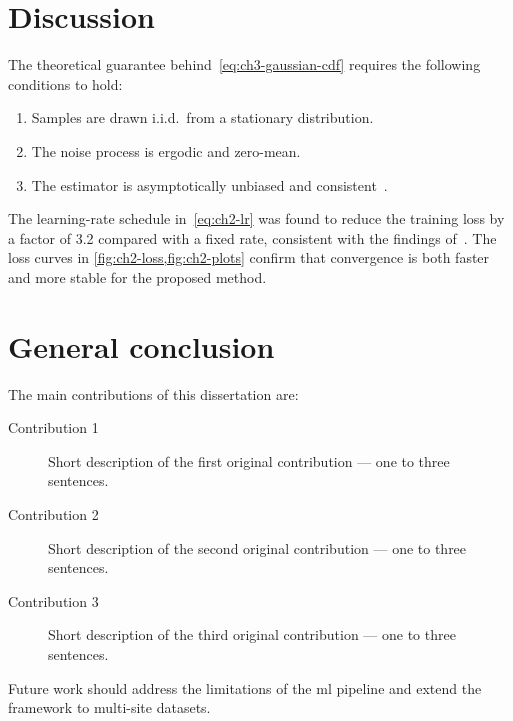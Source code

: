 \section{Discussion}

\lipsum[11]

The theoretical guarantee behind~\eqref{eq:ch3-gaussian-cdf}
requires the following conditions to hold:

\begin{enumerate}
  \item Samples are drawn i.i.d.\ from a stationary distribution.
  \item The noise process is ergodic and zero-mean.
  \item The estimator is asymptotically unbiased and
        consistent~\cite{hochreiter1997}.
\end{enumerate}

\lipsum[12]

The learning-rate schedule in~\eqref{eq:ch2-lr} was found to reduce
the training loss by a factor of \num{3.2} compared with a fixed
rate, consistent with the findings of~\cite{hochreiter1997}.
The loss curves in \cref{fig:ch2-loss,fig:ch2-plots} confirm that
convergence is both faster and more stable for the proposed method.

\section{General conclusion}

\lipsum[4]

The main contributions of this dissertation are:

\begin{description}
  \item[Contribution 1] Short description of the first original
    contribution — one to three sentences.
  \item[Contribution 2] Short description of the second original
    contribution — one to three sentences.
  \item[Contribution 3] Short description of the third original
    contribution — one to three sentences.
\end{description}

Future work should address the limitations of the \ac{ml} pipeline
and extend the framework to multi-site datasets.

\lipsum[5]

\printbibliography[heading=subbibliography, title={References}]
